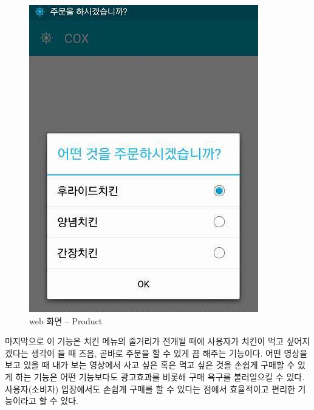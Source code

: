 \documentclass[chapter,oneside]{oblivoir}
\begin{document}
\begin{enumerate}
\begin{enumerate}
        \begin{figure}[h!]
            \centering
        \includegraphics{pic/chp78/img1123}
            \caption{web 화면 – Product}
        \end{figure} 

    마지막으로 이 기능은 치킨 메뉴의 줄거리가 전개될 때에 사용자가 치킨이 먹고 싶어지겠다는 생각이 들 때 즈음, 곧바로 주문을 할 수 있게 끔 해주는 기능이다. 어떤 영상을 보고 있을 때 내가 보는 영상에서 사고 싶은 혹은 먹고 싶은 것을 손쉽게 구매할 수 있게 하는 기능은 어떤 기능보다도 광고효과를 비롯해 구매 욕구를 불러일으킬 수 있다. 사용자(소비자) 입장에서도 손쉽게 구매를 할 수 있다는 점에서 효율적이고 편리한 기능이라고 할 수 있다.
    \end{enumerate}
\end{enumerate}
\end{document}
